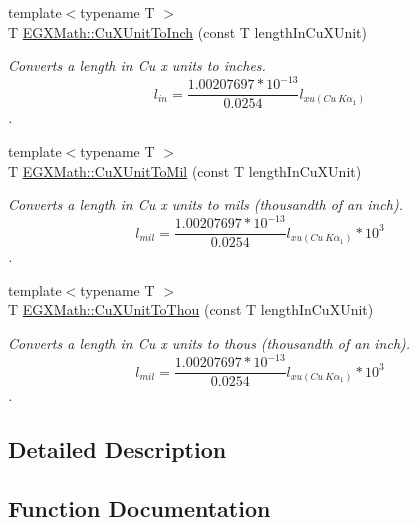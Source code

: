 \begin{DoxyCompactItemize}
{\footnotesize template$<$typename T $>$ }\\T \mbox{\hyperlink{group___e_g_x_math-_conversions-_length_conversions-_non-_s_i-_cu_x_unit-_imperial_ga7b5e4603f02f1aefa96487f4a19b2930}{E\+G\+X\+Math\+::\+Cu\+X\+Unit\+To\+Inch}} (const T length\+In\+Cu\+X\+Unit)
\begin{DoxyCompactList}\small\item\em Converts a length in Cu x units to inches. \[ l_{in}= \frac{1.00207697*10^{-13}}{0.0254} l_{xu(Cu\ K\alpha_1)} \]. \end{DoxyCompactList}\item 
{\footnotesize template$<$typename T $>$ }\\T \mbox{\hyperlink{group___e_g_x_math-_conversions-_length_conversions-_non-_s_i-_cu_x_unit-_imperial_ga060d8ffc384bcba07e0fde612e1a2156}{E\+G\+X\+Math\+::\+Cu\+X\+Unit\+To\+Mil}} (const T length\+In\+Cu\+X\+Unit)
\begin{DoxyCompactList}\small\item\em Converts a length in Cu x units to mils (thousandth of an inch). \[ l_{mil}= \frac{1.00207697*10^{-13}}{0.0254} l_{xu(Cu\ K\alpha_1)} * 10^{3} \]. \end{DoxyCompactList}\item 
{\footnotesize template$<$typename T $>$ }\\T \mbox{\hyperlink{group___e_g_x_math-_conversions-_length_conversions-_non-_s_i-_cu_x_unit-_imperial_ga3d9558a94551b20c5492dba8f01fcff6}{E\+G\+X\+Math\+::\+Cu\+X\+Unit\+To\+Thou}} (const T length\+In\+Cu\+X\+Unit)
\begin{DoxyCompactList}\small\item\em Converts a length in Cu x units to thous (thousandth of an inch). \[ l_{mil}= \frac{1.00207697*10^{-13}}{0.0254} l_{xu(Cu\ K\alpha_1)} * 10^{3} \]. \end{DoxyCompactList}\end{DoxyCompactItemize}


\subsection{Detailed Description}


\subsection{Function Documentation}
\mbox{\label{group___e_g_x_math-_conversions-_length_conversions-_non-_s_i-_cu_x_unit-_imperial_ga715aad2504073f62b0afd0e492d97f2a}} 
